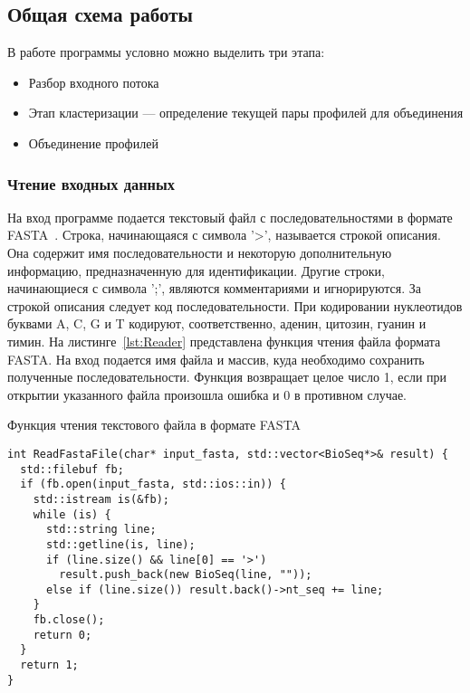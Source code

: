 \subsection[Общая схема работы]{\large Общая схема работы}
\hspace{\parindent} В работе программы условно можно выделить три этапа: 
\begin{itemize}
\item Разбор входного потока
\item Этап кластеризации --- определение текущей пары профилей для объединения
\item Объединение профилей
\end{itemize}

\subsubsection[Чтение входных данных]{\large Чтение входных данных}
\hspace{\parindent} На вход программе подается текстовый файл с последовательностями в формате FASTA~\cite{FASTAformat}. Строка, начинающаяся с символа '>', называется строкой описания. Она содержит имя последовательности и некоторую дополнительную информацию, предназначенную для идентификации. Другие строки, начинающиеся с символа ';', являются комментариями и игнорируются. За строкой описания следует код последовательности. При кодировании нуклеотидов буквами A, C, G и T кодируют, соответственно, аденин, цитозин, гуанин и тимин. На листинге~\ref{lst:Reader} представлена функция чтения файла формата FASTA. На вход подается имя файла и массив, куда необходимо сохранить полученные последовательности. Функция возвращает целое число 1, если при открытии указанного файла произошла ошибка и 0 в противном случае.
\begin{algorithm}
	\caption{Функция чтения текстового файла в формате FASTA} \label{lst:Reader}
	\begin{lstlisting}
int ReadFastaFile(char* input_fasta, std::vector<BioSeq*>& result) {
  std::filebuf fb;
  if (fb.open(input_fasta, std::ios::in)) {
    std::istream is(&fb);
    while (is) {
      std::string line;
      std::getline(is, line);
      if (line.size() && line[0] == '>') 
        result.push_back(new BioSeq(line, ""));
      else if (line.size()) result.back()->nt_seq += line;
    }
    fb.close();
    return 0;
  } 
  return 1;
}
	\end{lstlisting}
\end{algorithm}

